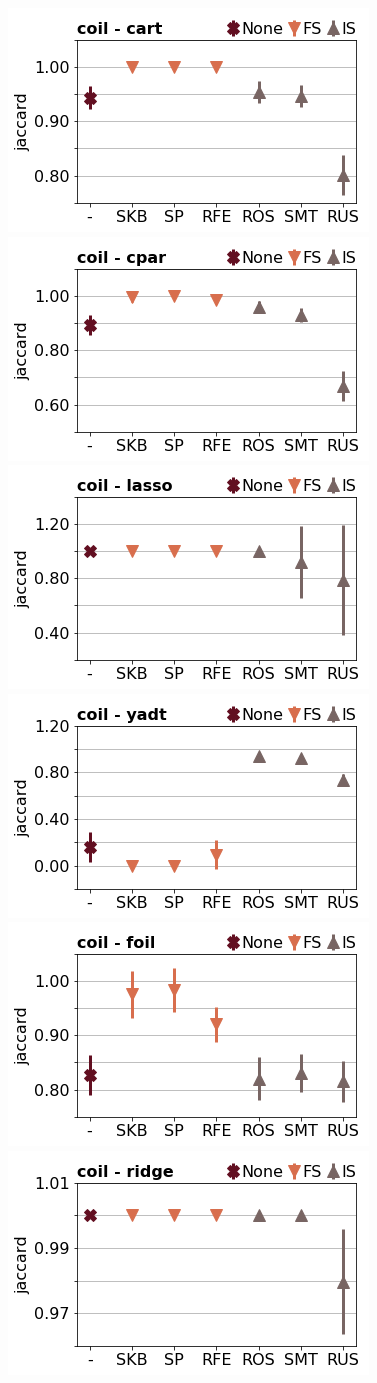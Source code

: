\documentclass[runningheads,a4paper]{llncs}
\begin{document}
\begin{figure}[!h]
\includegraphics[width=0.32\linewidth]{fig/preps_coil2000_DT_sklearn_jaccard.png}
\includegraphics[width=0.32\linewidth]{fig/preps_coil2000_RB_cpar_jaccard.png}
\includegraphics[width=0.32\linewidth]{fig/preps_coil2000_LM_lasso_jaccard.png}
\includegraphics[width=0.32\linewidth]{fig/preps_coil2000_DT_yadt_jaccard.png}
\includegraphics[width=0.32\linewidth]{fig/preps_coil2000_RB_foil_jaccard.png}
\includegraphics[width=0.32\linewidth]{fig/preps_coil2000_LM_ridge_jaccard.png}
\end{figure}
\end{document}

